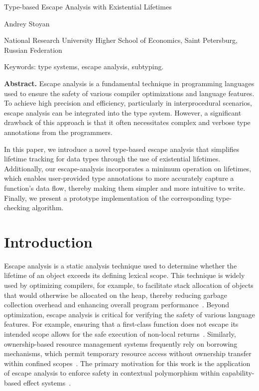\documentclass[11pt]{article}
\begin{document}
    \begin{center}
        \LARGE
        Type-based Escape Analysis with Existential Lifetimes

        \small
        Andrey Stoyan

        National Research University Higher School of Economics, Saint Petersburg, Russian Federation

        Keywords: type systems, escape analysis, subtyping.
    \end{center}

    \textbf{Abstract.}
    Escape analysis is a fundamental technique in programming languages used to ensure the safety of various compiler optimizations and language features.
    To achieve high precision and efficiency, particularly in interprocedural scenarios, escape analysis can be integrated into the type system.
    However, a significant drawback of this approach is that it often necessitates complex and verbose type annotations from the programmers.

    In this paper, we introduce a novel type-based escape analysis that simplifies lifetime tracking for data types through the use of existential lifetimes.
    Additionally, our escape-analysis incorporates a minimum operation on lifetimes, which enables user-provided type annotations to more accurately capture a function’s data flow, thereby making them simpler and more intuitive to write.
    Finally, we present a prototype implementation of the corresponding type-checking algorithm.


    \section{Introduction}


    Escape analysis is a static analysis technique used to determine whether the lifetime of an object exceeds its defining lexical scope.
    This technique is widely used by optimizing compilers, for example, to facilitate stack allocation of objects that would otherwise be allocated on the heap, thereby reducing garbage collection overhead and enhancing overall program performance~\cite{blanchet1999escape}.
    Beyond optimization, escape analysis is critical for verifying the safety of various language features.
    For example, ensuring that a first-class function does not escape its intended scope allows for the safe execution of non-local returns~\cite{akhin2021kotlin}.
    Similarly, ownership-based resource management systems frequently rely on borrowing mechanisms, which permit temporary resource access without ownership transfer within confined scopes~\cite{matsakis2014rust, lorenzen2024oxidizing}.
    The primary motivation for this work is the application of escape analysis to enforce safety in contextual polymorphism within capability-based effect systems~\cite{brachthauser2020effects, boruch2023capturing}.
\end{document}
